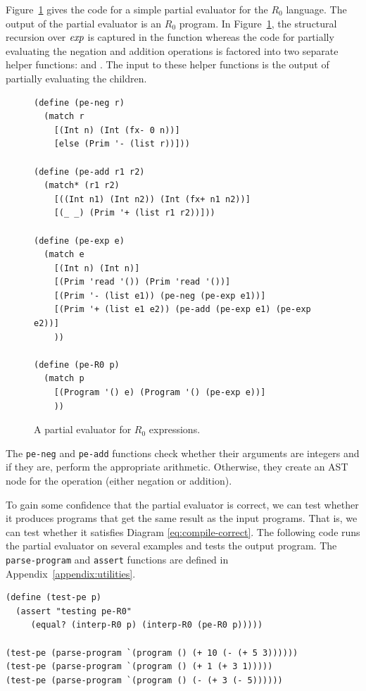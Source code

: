 \documentclass[11pt]{book}
\begin{document}
Figure~\ref{fig:pe-arith} gives the code for a simple partial
evaluator for the $R_0$ language. The output of the partial evaluator
is an $R_0$ program. In Figure~\ref{fig:pe-arith}, the structural
recursion over $\mathit{exp}$ is captured in the  function
whereas the code for partially evaluating the negation and addition
operations is factored into two separate helper functions:
 and . The input to these helper
functions is the output of partially evaluating the children.

\begin{figure}[tp]
\begin{lstlisting}
(define (pe-neg r)
  (match r
    [(Int n) (Int (fx- 0 n))]
    [else (Prim '- (list r))]))

(define (pe-add r1 r2)
  (match* (r1 r2)
    [((Int n1) (Int n2)) (Int (fx+ n1 n2))]
    [(_ _) (Prim '+ (list r1 r2))]))

(define (pe-exp e)
  (match e
    [(Int n) (Int n)]
    [(Prim 'read '()) (Prim 'read '())]
    [(Prim '- (list e1)) (pe-neg (pe-exp e1))]
    [(Prim '+ (list e1 e2)) (pe-add (pe-exp e1) (pe-exp e2))]
    ))

(define (pe-R0 p)
  (match p
    [(Program '() e) (Program '() (pe-exp e))]
    ))
\end{lstlisting}
\caption{A partial evaluator for $R_0$ expressions.}
\label{fig:pe-arith}
\end{figure}

The \texttt{pe-neg} and \texttt{pe-add} functions check whether their
arguments are integers and if they are, perform the appropriate
arithmetic.  Otherwise, they create an AST node for the operation
(either negation or addition).

To gain some confidence that the partial evaluator is correct, we can
test whether it produces programs that get the same result as the
input programs. That is, we can test whether it satisfies Diagram
\eqref{eq:compile-correct}. The following code runs the partial
evaluator on several examples and tests the output program.  The
\texttt{parse-program} and \texttt{assert} functions are defined in
Appendix~\ref{appendix:utilities}.\\
\begin{minipage}{1.0\textwidth}
\begin{lstlisting}
(define (test-pe p)
  (assert "testing pe-R0"
     (equal? (interp-R0 p) (interp-R0 (pe-R0 p)))))

(test-pe (parse-program `(program () (+ 10 (- (+ 5 3))))))
(test-pe (parse-program `(program () (+ 1 (+ 3 1)))))
(test-pe (parse-program `(program () (- (+ 3 (- 5))))))
\end{lstlisting}
\end{minipage}
\end{document}
